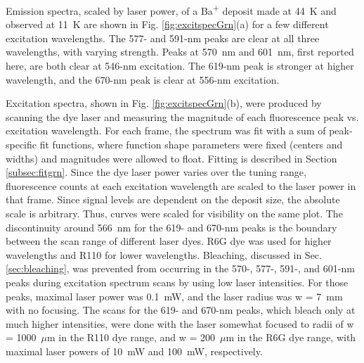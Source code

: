 



Emission spectra, scaled by laser power, of a Ba\textsuperscript{+} deposit made at 44~K and observed at 11~K are shown in Fig. \ref{fig:excitspecGrn}(a) for a few different excitation wavelengths.  The 577- and 591-nm peaks are clear at all three wavelengths, with varying strength.  Peaks at 570~nm and 601~nm, first reported here, are both clear at 546-nm excitation.  The 619-nm peak is stronger at higher wavelength, and the 670-nm peak is clear at 556-nm excitation.

Excitation spectra, shown in Fig. \ref{fig:excitspecGrn}(b), were produced by scanning the dye laser and measuring the magnitude of each fluorescence peak vs. excitation wavelength.  For each frame, the spectrum was fit with a sum of peak-specific fit functions, where function shape parameters were fixed (centers and widths) and magnitudes were allowed to float.  Fitting is described in Section \ref{subsec:fitgrn}.  Since the dye laser power varies over the tuning range, fluorescence counts at each excitation wavelength are scaled to the laser power in that frame.  Since signal levels are dependent on the deposit size, the absolute scale is arbitrary.  Thus, curves were scaled for visibility on the same plot.  The discontinuity around 566~nm for the 619- and 670-nm peaks is the boundary between the scan range of different laser dyes.  R6G dye was used for higher wavelengths and R110 for lower wavelengths.  Bleaching, discussed in Sec. \ref{sec:bleaching}, was prevented from occurring in the 570-, 577-, 591-, and 601-nm peaks during excitation spectrum scans by using low laser intensities.  For those peaks, maximal laser power was 0.1~mW, and the laser radius was w = 7~mm with no focusing.  The scans for the 619- and 670-nm peaks, which bleach only at much higher intensities, were done with the laser somewhat focused to radii of w = 1000~$\mu$m in the R110 dye range, and w = 200~$\mu$m in the R6G dye range, with maximal laser powers of 10~mW and 100~mW, respectively.

